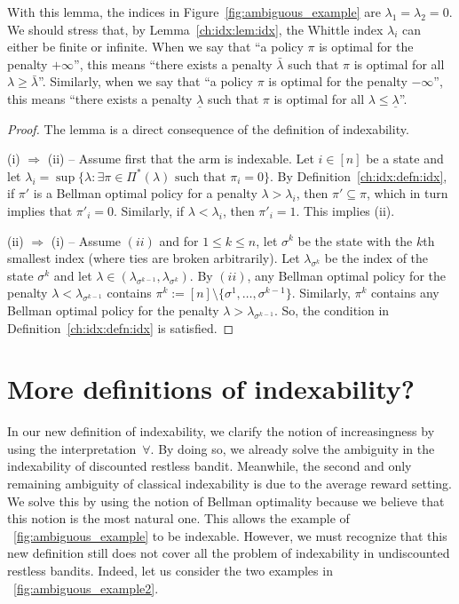 With this lemma, the indices in Figure~\ref{fig:ambiguous_example} are $\lambda_1=\lambda_2=0$.
We should stress that, by Lemma~\ref{ch:idx:lem:idx}, the Whittle index $\lambda_i$ can either be finite or infinite. When we say that ``a policy $\pi$ is optimal for the penalty $+\infty$'', this means ``there exists a penalty $\bar{\lambda}$ such that $\pi$ is optimal for all $\lambda\ge\bar{\lambda}$''.
Similarly, when we say that ``a policy $\pi$ is optimal for the penalty $-\infty$'', this means ``there exists a penalty $\underline{\lambda}$ such that $\pi$ is optimal for all $\lambda\le\underline{\lambda}$''.

\begin{proof}
    The lemma is a direct consequence of the definition of indexability.

    (i) $\Rightarrow$ (ii) -- Assume first that the arm is indexable.
    Let $i\in[n]$ be a state and let $\lambda_i=\sup\{\lambda : \exists\pi\in\Pi^*(\lambda)\text{ such that }\pi_i=0\}$.
    By Definition~\ref{ch:idx:defn:idx}, if $\pi'$ is a Bellman optimal policy for a penalty $\lambda>\lambda_i$, then $\pi'\subseteq\pi$, which in turn implies that $\pi'_i=0$.
    Similarly, if $\lambda<\lambda_i$, then $\pi'_i=1$. This implies (ii).

    (ii) $\Rightarrow$ (i) -- Assume $(ii)$ and for $1\le k\le n$, let $\sigma^k$ be the state with the $k$th smallest index (where ties are broken arbitrarily).
    Let $\lambda_{\sigma^k}$ be the index of the state $\sigma^k$ and let $\lambda\in(\lambda_{\sigma^{k-1}}, \lambda_{\sigma^k})$. 
    By $(ii)$, any Bellman optimal policy for the penalty $\lambda<\lambda_{\sigma^{k-1}}$ contains $\pi^{k}:=[n]\setminus\{\sigma^1,\dots, \sigma^{k-1}\}$. Similarly, $\pi^{k}$ contains any Bellman optimal policy for the penalty $\lambda>\lambda_{\sigma^{k-1}}$.
    So, the condition in Definition~\ref{ch:idx:defn:idx} is satisfied.
\end{proof}

\section{More definitions of indexability?}
\label{ch:idx:sec:more_defn}

In our new definition of indexability, we clarify the notion of increasingness by using the interpretation~$\forall$.
By doing so, we already solve the ambiguity in the indexability of discounted restless bandit.
Meanwhile, the second and only remaining ambiguity of classical indexability is due to the average reward setting.
We solve this by using the notion of Bellman optimality because we believe that this notion is the most natural one.
This allows the example of \figurename~\ref{fig:ambiguous_example} to be indexable.
However, we must recognize that this new definition still does not cover all the problem of indexability in undiscounted restless bandits.
Indeed, let us consider the two examples in \figurename~\ref{fig:ambiguous_example2}.

